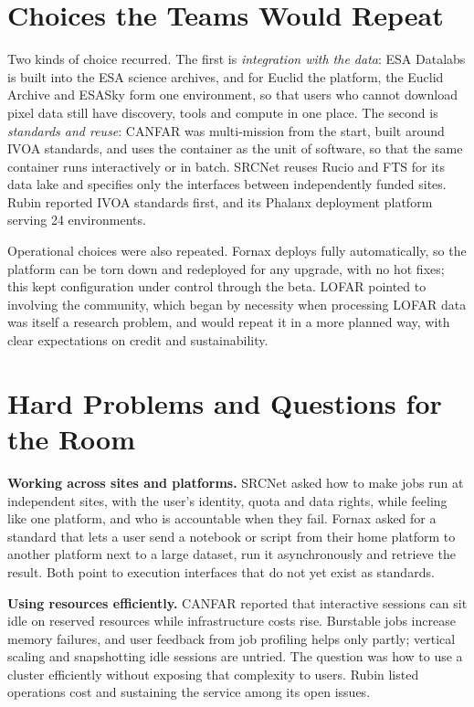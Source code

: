 \documentclass[11pt,twoside]{article}
\begin{document}
\section{Choices the Teams Would Repeat}

Two kinds of choice recurred. The first is \emph{integration with the data}: ESA
Datalabs is built into the ESA science archives, and for Euclid the platform,
the Euclid Archive and ESASky form one environment, so that users who cannot
download pixel data still have discovery, tools and compute in one place. The
second is \emph{standards and reuse}: CANFAR was multi-mission from the start,
built around IVOA standards, and uses the container as the unit of software, so
that the same container runs interactively or in batch. SRCNet reuses Rucio and
FTS \citep{2019CSBS....3...11B} for its data lake and specifies only the
interfaces between independently funded sites. Rubin reported IVOA standards
first, and its Phalanx deployment platform serving 24 environments.

Operational choices were also repeated. Fornax deploys fully automatically, so
the platform can be torn down and redeployed for any upgrade, with no hot fixes;
this kept configuration under control through the beta. LOFAR pointed to
involving the community, which began by necessity when processing LOFAR data
was itself a research problem, and would repeat it in a more planned way, with
clear expectations on credit and sustainability.

\section{Hard Problems and Questions for the Room}

\textbf{Working across sites and platforms.} SRCNet asked how to make jobs run
at independent sites, with the user's identity, quota and data rights, while
feeling like one platform, and who is accountable when they fail. Fornax asked
for a standard that lets a user send a notebook or script from their home
platform to another platform next to a large dataset, run it asynchronously and
retrieve the result. Both point to execution interfaces that do not yet exist
as standards.

\textbf{Using resources efficiently.} CANFAR reported that interactive sessions
can sit idle on reserved resources while infrastructure costs rise. Burstable
jobs increase memory failures, and user feedback from job profiling helps only
partly; vertical scaling and snapshotting idle sessions are untried. The
question was how to use a cluster efficiently without exposing that complexity
to users. Rubin listed operations cost and sustaining the service among its
open issues.
\end{document}
